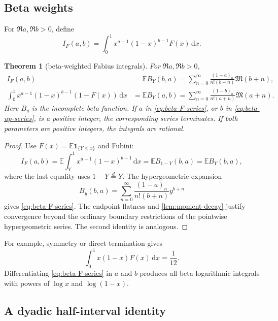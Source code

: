 \documentclass[11pt,oneside]{article}
\newtheorem{theorem}{Theorem}[section]
\theoremstyle{definition}
\newcommand{\F}{F}
\newcommand{\M}{\mathfrak M}
\newcommand{\E}{\mathbb E}
\newcommand{\dd}{\,\mathrm d}
\newcommand{\ind}{\mathbf 1}
\begin{document}
\subsection{Beta weights}

For \(\Re a,\Re b>0\), define
\begin{equation}\label{eq:IFab}
 I_F(a,b)=\int_0^1x^{a-1}(1-x)^{b-1}\F(x)\dd x.
\end{equation}

\begin{theorem}[beta-weighted Fabius integrals]\label{thm:beta-F}
For \(\Re a,\Re b>0\),
\begin{align}
 I_F(a,b)
 &=\E B_Y(b,a)
 =\sum_{n=0}^{\infty}
 \frac{(1-a)_n}{n!(b+n)}\M(b+n),
 \label{eq:beta-F-series}\\
 \int_0^1x^{a-1}(1-x)^{b-1}(1-\F(x))\dd x
 &=\E B_Y(a,b)
 =\sum_{n=0}^{\infty}
 \frac{(1-b)_n}{n!(a+n)}\M(a+n).
 \label{eq:beta-up-series}
\end{align}
Here \(B_y\) is the incomplete beta function.  If \(a\) in
\cref{eq:beta-F-series}, or \(b\) in \cref{eq:beta-up-series}, is a positive integer,
the corresponding series terminates.  If both parameters are positive integers, the
integrals are rational.
\end{theorem}

\begin{proof}
Use \(\F(x)=\E\ind_{\{Y\le x\}}\) and Fubini:
\[
 I_F(a,b)=\E\int_Y^1x^{a-1}(1-x)^{b-1}\dd x
 =\E B_{1-Y}(b,a)=\E B_Y(b,a),
\]
where the last equality uses \(1-Y\overset d=Y\).  The hypergeometric expansion
\[
 B_y(b,a)=\sum_{n=0}^{\infty}
 \frac{(1-a)_n}{n!(b+n)}y^{b+n}
\]
gives \cref{eq:beta-F-series}.  The endpoint flatness and
\cref{lem:moment-decay} justify convergence beyond the ordinary boundary restrictions
of the pointwise hypergeometric series.  The second identity is analogous.
\end{proof}

For example, symmetry or direct termination gives
\begin{equation}\label{eq:beta-example}
 \int_0^1x(1-x)\F(x)\dd x=\frac1{12}.
\end{equation}
Differentiating \cref{eq:beta-F-series} in \(a\) and \(b\) produces all beta-logarithmic
integrals with powers of \(\log x\) and \(\log(1-x)\).

\subsection{A dyadic half-interval identity}
\end{document}
